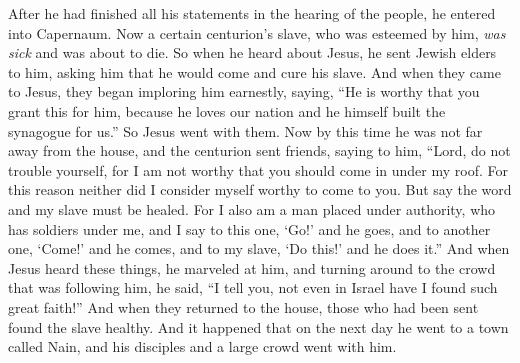 \begin{biblechapter} %
 After he had finished all his statements in the hearing of the people, he entered into Capernaum.
\verse Now a certain centurion’s slave, who was esteemed by him, \textit{was sick} and was about to die.
\verse So when he heard about Jesus, he sent Jewish elders to him, asking him that he would come and cure his slave.
\verse And when they came to Jesus, they began imploring him earnestly, saying, “He is worthy that you grant this for him,
\verse because he loves our nation and he himself built the synagogue for us.”
\verse So Jesus went with them. Now by this time he was not far away from the house, and the centurion sent friends, saying to him, “Lord, do not trouble yourself, for I am not worthy that you should come in under my roof.
\verse For this reason neither did I consider myself worthy to come to you. But say the word and my slave must be healed.
\verse For I also am a man placed under authority, who has soldiers under me, and I say to this one, ‘Go!’ and he goes, and to another one, ‘Come!’ and he comes, and to my slave, ‘Do this!’ and he does it.”
\verse And when Jesus heard these things, he marveled at him, and turning around to the crowd that was following him, he said, “I tell you, not even in Israel have I found such great faith!”
\verse And when they returned to the house, those who had been sent found the slave healthy.
 And it happened that on the next day he went to a town called Nain, and his disciples and a large crowd went with him.

\end{biblechapter}
